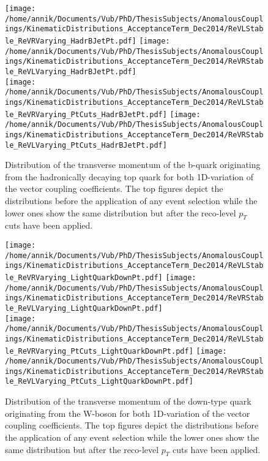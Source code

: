 \begin{figure}[!h]
 \centering
 \texttt{[image: /home/annik/Documents/Vub/PhD/ThesisSubjects/AnomalousCouplings/KinematicDistributions\_AcceptanceTerm\_Dec2014/ReVLStable\_ReVRVarying\_HadrBJetPt.pdf]}
 \texttt{[image: /home/annik/Documents/Vub/PhD/ThesisSubjects/AnomalousCouplings/KinematicDistributions\_AcceptanceTerm\_Dec2014/ReVRStable\_ReVLVarying\_HadrBJetPt.pdf]}\\
 \texttt{[image: /home/annik/Documents/Vub/PhD/ThesisSubjects/AnomalousCouplings/KinematicDistributions\_AcceptanceTerm\_Dec2014/ReVLStable\_ReVRVarying\_PtCuts\_HadrBJetPt.pdf]}
 \texttt{[image: /home/annik/Documents/Vub/PhD/ThesisSubjects/AnomalousCouplings/KinematicDistributions\_AcceptanceTerm\_Dec2014/ReVRStable\_ReVLVarying\_PtCuts\_HadrBJetPt.pdf]}
 \caption{Distribution of the transverse momentum of the b-quark originating from the hadronically decaying top quark for both 1D-variation of the vector coupling coefficients. The top figures depict the distributions before the application of any event selection while the lower ones show the same distribution but after the reco-level $p_T$ cuts have been applied.}
 \label{fig::KinChangeBJetPt}
\end{figure}

\begin{figure}[!h]
 \centering
 \texttt{[image: /home/annik/Documents/Vub/PhD/ThesisSubjects/AnomalousCouplings/KinematicDistributions\_AcceptanceTerm\_Dec2014/ReVLStable\_ReVRVarying\_LightQuarkDownPt.pdf]}
 \texttt{[image: /home/annik/Documents/Vub/PhD/ThesisSubjects/AnomalousCouplings/KinematicDistributions\_AcceptanceTerm\_Dec2014/ReVRStable\_ReVLVarying\_LightQuarkDownPt.pdf]}\\
 \texttt{[image: /home/annik/Documents/Vub/PhD/ThesisSubjects/AnomalousCouplings/KinematicDistributions\_AcceptanceTerm\_Dec2014/ReVLStable\_ReVRVarying\_PtCuts\_LightQuarkDownPt.pdf]}
 \texttt{[image: /home/annik/Documents/Vub/PhD/ThesisSubjects/AnomalousCouplings/KinematicDistributions\_AcceptanceTerm\_Dec2014/ReVRStable\_ReVLVarying\_PtCuts\_LightQuarkDownPt.pdf]}
 \caption{Distribution of the transverse momentum of the down-type quark originating from the W-boson for both 1D-variation of the vector coupling coefficients. The top figures depict the distributions before the application of any event selection while the lower ones show the same distribution but after the reco-level $p_T$ cuts have been applied.}
 \label{fig::KinChangeDownQPt}
\end{figure}

